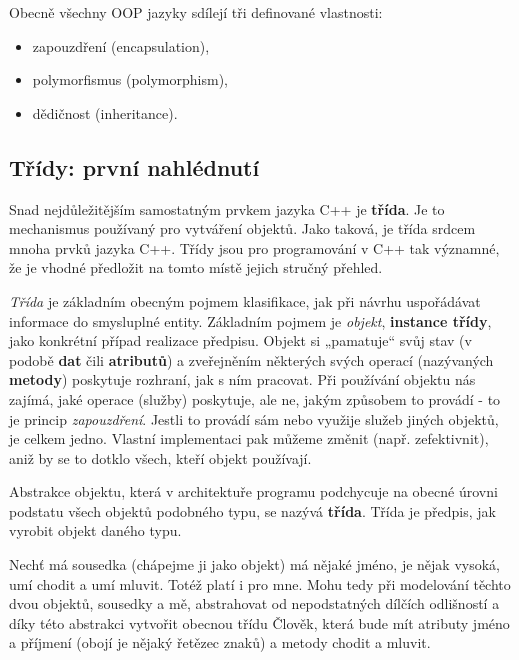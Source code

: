 {    Obecně všechny OOP jazyky sdílejí tři definované vlastnosti:
    \begin{itemize}\addtolength{\itemsep}{-0.5\baselineskip}
      \item zapouzdření (encapsulation),
      \item polymorfismus (polymorphism),
      \item dědičnost (inheritance).
    \end{itemize}
  
    \subsection{Třídy: první nahlédnutí}
      Snad nejdůležitějším samostatným prvkem jazyka C++ je \textbf{třída}. Je to mechanismus 
      používaný pro vytváření objektů. Jako taková, je třída srdcem mnoha prvků jazyka C++. Třídy 
      jsou pro programování v C++ tak významné, že je vhodné předložit na tomto místě jejich 
      stručný 
      přehled.
  
      \begin{definition}[Třída]
        \emph{Třída} je základním obecným pojmem klasifikace, jak při návrhu uspořádávat informace 
        do smysluplné entity. Základním pojmem je \emph{objekt}, \textbf{instance třídy}, jako 
        konkrétní případ realizace předpisu. Objekt si „pamatuje“ svůj stav (v podobě \textbf{dat} 
        čili \textbf{atributů}) a zveřejněním některých svých operací (nazývaných \textbf{metody}) 
        poskytuje rozhraní, jak s ním pracovat. Při používání objektu nás zajímá, jaké operace 
        (služby) poskytuje, ale ne, jakým způsobem to provádí - to je princip \emph{zapouzdření}. 
        Jestli to provádí sám nebo využije služeb jiných objektů, je celkem jedno. Vlastní 
        implementaci pak můžeme změnit (např. zefektivnit), aniž by se to dotklo všech, kteří 
        objekt používají.
  
        Abstrakce objektu, která v architektuře programu podchycuje na obecné úrovni podstatu všech 
        objektů podobného typu, se nazývá \textbf{třída}. Třída je předpis, jak vyrobit objekt 
        daného typu.
      \end{definition}
      
      \begin{example}
        Nechť má sousedka (chápejme ji jako objekt) má nějaké jméno, je nějak vysoká, umí chodit a 
        umí mluvit. Totéž platí i pro mne. Mohu tedy při modelování těchto dvou objektů, sousedky a 
        mě, abstrahovat od nepodstatných dílčích odlišností a díky této abstrakci vytvořit obecnou 
        třídu Člověk, která bude mít atributy jméno a příjmení (obojí je nějaký řetězec znaků) a 
        metody chodit a mluvit.
      \end{example}
  
}
